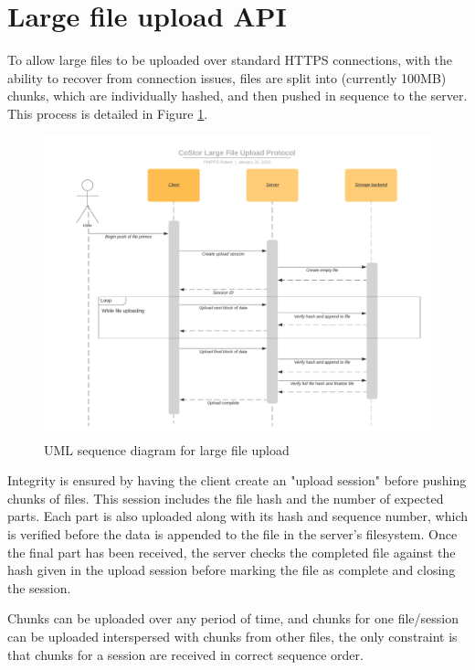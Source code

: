 \documentclass[bsc,frontabs,twoside,singlespacing,parskip,deptreport]{infthesis}     %
\begin{document}
\section{Large file upload API}

To allow large files to be uploaded over standard HTTPS connections, with the ability to recover
from connection issues, files are split into (currently 100MB) chunks, which are individually
hashed, and then pushed in sequence to the server. This process is detailed in Figure \ref{fig:lfileupload}.

\begin{figure}
	\includegraphics[width=1.1\linewidth]{img/lfileupload.png}
	\caption{UML sequence diagram for large file upload}
	\label{fig:lfileupload}
\end{figure}

Integrity is ensured by having the client create an "upload session" before pushing chunks of
files. This session includes the file hash and the number of expected parts. Each part is also 
uploaded along with its hash and sequence number, which is verified before the data is appended 
to the file in the server's filesystem. Once the final part has been received, the server 
checks the completed file against the hash given in the upload session before marking the file
as complete and closing the session.

Chunks can be uploaded over any period of time, and chunks for one file/session can be uploaded
interspersed with chunks from other files, the only constraint is that chunks for a session are
received in correct sequence order.
\end{document}
